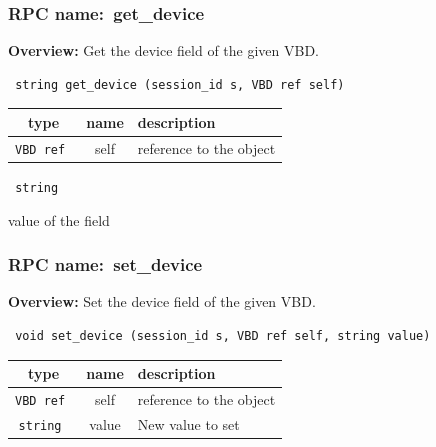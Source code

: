 \subsubsection{RPC name:~get\_device}

{\bf Overview:} 
Get the device field of the given VBD.

\begin{verbatim} string get_device (session_id s, VBD ref self)\end{verbatim}



 
\vspace{0.3cm}
\begin{tabular}{|c|c|p{7cm}|}
 \hline
{\bf type} & {\bf name} & {\bf description} \\ \hline
{\tt VBD ref } & self & reference to the object \\ \hline 

\end{tabular}

\vspace{0.3cm}

{\tt 
string
}


value of the field
\vspace{0.3cm}
\vspace{0.3cm}
\vspace{0.3cm}
\subsubsection{RPC name:~set\_device}

{\bf Overview:} 
Set the device field of the given VBD.

\begin{verbatim} void set_device (session_id s, VBD ref self, string value)\end{verbatim}



 
\vspace{0.3cm}
\begin{tabular}{|c|c|p{7cm}|}
 \hline
{\bf type} & {\bf name} & {\bf description} \\ \hline
{\tt VBD ref } & self & reference to the object \\ \hline 

{\tt string } & value & New value to set \\ \hline 

\end{tabular}

